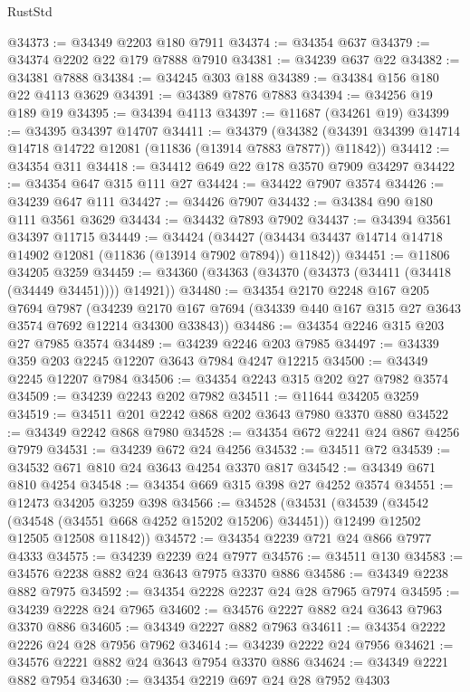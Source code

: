 \begin{lexlean}{RustStd}
\begin{coremodule}
@34373 := @34349 @2203 @180 @7911
@34374 := @34354 @637
@34379 := @34374 @2202 @22 @179 @7888 @7910
@34381 := @34239 @637 @22
@34382 := @34381 @7888
@34384 := @34245 @303 @188
@34389 := @34384 @156 @180 @22 @4113 @3629
@34391 := @34389 @7876 @7883
@34394 := @34256 @19 @189 @19
@34395 := @34394 @4113
@34397 := @11687 (@34261 @19)
@34399 := @34395 @34397 @14707
@34411 := @34379
    (@34382 (@34391 @34399 @14714 @14718 @14722 @12081 (@11836 (@13914 @7883 @7877)) @11842))
@34412 := @34354 @311
@34418 := @34412 @649 @22 @178 @3570 @7909 @34297
@34422 := @34354 @647 @315 @111 @27
@34424 := @34422 @7907 @3574
@34426 := @34239 @647 @111
@34427 := @34426 @7907
@34432 := @34384 @90 @180 @111 @3561 @3629
@34434 := @34432 @7893 @7902
@34437 := @34394 @3561 @34397 @11715
@34449 := @34424
    (@34427 (@34434 @34437 @14714 @14718 @14902 @12081 (@11836 (@13914 @7902 @7894)) @11842))
@34451 := @11806 @34205 @3259
@34459 := @34360 (@34363 (@34370 (@34373 (@34411 (@34418 (@34449 @34451)))) @14921))
@34480 := @34354
    @2170
    @2248
    @167
    @205
    @7694
    @7987
    (@34239 @2170 @167 @7694 (@34339 @440 @167 @315 @27 @3643 @3574 @7692 @12214 @34300 @33843))
@34486 := @34354 @2246 @315 @203 @27 @7985 @3574
@34489 := @34239 @2246 @203 @7985
@34497 := @34339 @359 @203 @2245 @12207 @3643 @7984 @4247 @12215
@34500 := @34349 @2245 @12207 @7984
@34506 := @34354 @2243 @315 @202 @27 @7982 @3574
@34509 := @34239 @2243 @202 @7982
@34511 := @11644 @34205 @3259
@34519 := @34511 @201 @2242 @868 @202 @3643 @7980 @3370 @880
@34522 := @34349 @2242 @868 @7980
@34528 := @34354 @672 @2241 @24 @867 @4256 @7979
@34531 := @34239 @672 @24 @4256
@34532 := @34511 @72
@34539 := @34532 @671 @810 @24 @3643 @4254 @3370 @817
@34542 := @34349 @671 @810 @4254
@34548 := @34354 @669 @315 @398 @27 @4252 @3574
@34551 := @12473 @34205 @3259 @398
@34566 := @34528
    (@34531
      (@34539
        (@34542 (@34548 (@34551 @668 @4252 @15202 @15206) @34451))
        @12499
        @12502
        @12505
        @12508
        @11842))
@34572 := @34354 @2239 @721 @24 @866 @7977 @4333
@34575 := @34239 @2239 @24 @7977
@34576 := @34511 @130
@34583 := @34576 @2238 @882 @24 @3643 @7975 @3370 @886
@34586 := @34349 @2238 @882 @7975
@34592 := @34354 @2228 @2237 @24 @28 @7965 @7974
@34595 := @34239 @2228 @24 @7965
@34602 := @34576 @2227 @882 @24 @3643 @7963 @3370 @886
@34605 := @34349 @2227 @882 @7963
@34611 := @34354 @2222 @2226 @24 @28 @7956 @7962
@34614 := @34239 @2222 @24 @7956
@34621 := @34576 @2221 @882 @24 @3643 @7954 @3370 @886
@34624 := @34349 @2221 @882 @7954
@34630 := @34354 @2219 @697 @24 @28 @7952 @4303

\end{coremodule}
\end{lexlean}
